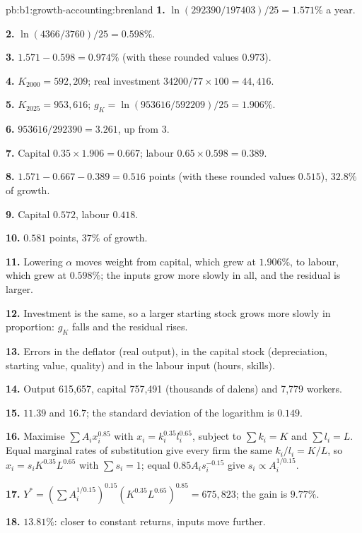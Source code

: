 \begin{solution}{pb:b1:growth-accounting:brenland}
\textbf{1.} $\ln(292390/197403)/25 = 1.571\%$ a year.

\textbf{2.} $\ln(4366/3760)/25 = 0.598\%$.

\textbf{3.} $1.571 - 0.598 = 0.974\%$ (with these rounded values $0.973$).

\textbf{4.} $K_{2000} = 592{,}209$; real investment $34200/77 \times 100 = 44{,}416$.

\textbf{5.} $K_{2025} = 953{,}616$; $g_K = \ln(953616/592209)/25 = 1.906\%$.

\textbf{6.} $953616/292390 = 3.261$, up from 3.

\textbf{7.} Capital $0.35 \times 1.906 = 0.667$; labour $0.65 \times 0.598 = 0.389$.

\textbf{8.} $1.571 - 0.667 - 0.389 = 0.516$ points (with these rounded values $0.515$), $32.8\%$ of growth.

\textbf{9.} Capital $0.572$, labour $0.418$.

\textbf{10.} $0.581$ points, $37\%$ of growth.

\textbf{11.} Lowering $\alpha$ moves weight from capital, which grew at $1.906\%$, to
labour, which grew at $0.598\%$; the inputs grow more slowly in all, and the
residual is larger.

\textbf{12.} Investment is the same, so a larger starting stock grows more
slowly in proportion: $g_K$ falls and the residual rises.

\textbf{13.} Errors in the deflator (real output), in the capital stock
(depreciation, starting value, quality) and in the labour input (hours,
skills).

\textbf{14.} Output 615,657, capital 757,491 (thousands of dalens) and 7,779
workers.

\textbf{15.} $11.39$ and $16.7$; the standard deviation of the logarithm is $0.149$.

\textbf{16.} Maximise $\sum A_i x_i^{0.85}$ with $x_i = k_i^{0.35}l_i^{0.65}$, subject to $\sum k_i = K$ and $\sum l_i = L$.
Equal marginal rates of substitution give every firm the same $k_i/l_i = K/L$,
so $x_i = s_i K^{0.35}L^{0.65}$ with $\sum s_i = 1$; equal  $0.85A_i s_i^{-0.15}$ give
$s_i \propto A_i^{1/0.15}$.

\textbf{17.} $Y^* = (\sum A_i^{1/0.15})^{0.15}(K^{0.35}L^{0.65})^{0.85} = 675{,}823$; the gain is $9.77\%$.

\textbf{18.} $13.81\%$: closer to constant returns, inputs move further.


\end{solution}
